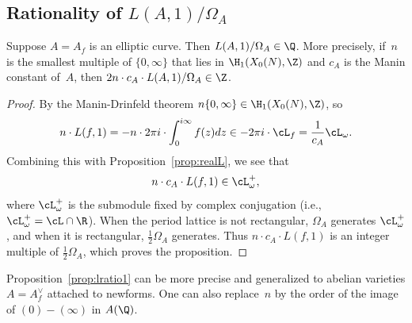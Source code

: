 \documentclass{report}
\begin{document}
\subsection{Rationality of $L(A,1)/\Omega_A$}

\begin{proposition}\label{prop:lratio1}
  Suppose $A=A_f$ is an elliptic curve.  Then $L(A,1)/\Omega_A \in\Q$.
  More precisely, if~$n$ is the smallest multiple of $\{0,\infty\}$
  that lies in $\H_1(X_0(N),\Z)$ and $c_A$ is the Manin constant of~$A$, then
  $2 n \cdot c_A \cdot L(A,1)/\Omega_A \in\Z$.
\end{proposition}
\begin{proof}
By the Manin-Drinfeld theorem $n\{0,\infty\}\in\H_1(X_0(N),\Z)$, so
$$
  n \cdot L(f,1) = -n\cdot 2\pi i \cdot \int_{0}^{i\infty} f(z)dz
  \in -2\pi i\cdot\cL_f
         = \frac{1}{c_A} \cL_\omega.
$$
Combining this with Proposition~\ref{prop:realL}, we see that
$$
  n \cdot c_A \cdot L(f,1) \in \cL_\omega^+,
  $$
  where $\cL_\omega^+$ is the submodule fixed by complex
  conjugation (i.e., $\cL_\omega^+ = \cL\cap \R$).  When the period
  lattice is not rectangular, $\Omega_A$ generates $\cL_\omega^+$, and
  when it is rectangular, $\frac{1}{2}\Omega_A$ generates.  Thus $n
  \cdot c_A \cdot L(f,1)$ is an integer multiple of
  $\frac{1}{2}\Omega_A$, which proves the proposition.
\end{proof}

Proposition~\ref{prop:lratio1} can be more precise and generalized to
abelian varieties $A=A_f^{\vee}$ attached to newforms.
One can also replace~$n$ by the order of the image of $(0)-(\infty)$
in $A(\Q)$.
\end{document}
